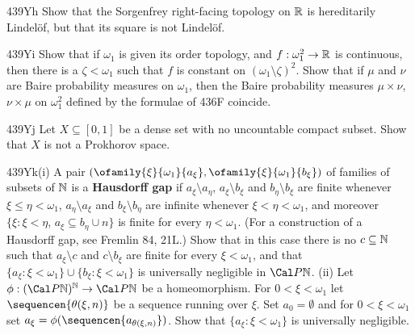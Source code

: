 {\spheader 439Yh Show that the Sorgenfrey right-facing topology on
$\Bbb R$ is hereditarily Lindel\"of, but that its square is not
Lindel\"of.

\spheader 439Yi Show that if $\omega_1$ is given its order topology, and
$f:\omega_1^2\to\Bbb R$ is continuous, then there is a $\zeta<\omega_1$
such that $f$ is constant on $(\omega_1\setminus\zeta)^2$.
   Show that if $\mu$ and $\nu$ are Baire probability
measures on $\omega_1$, then the Baire probability measures
$\mu\times\nu$, $\nu\times\mu$ on $\omega_1^2$ defined by the formulae
of 436F coincide.

\spheader 439Yj Let $X\subseteq[0,1]$ be a dense set with no
uncountable compact subset.   Show that $X$ is not a Prokhorov space.

\spheader 439Yk(i) A pair
$(\ofamily{\xi}{\omega_1}{a_{\xi}},\ofamily{\xi}{\omega_1}{b_{\xi}})$ of
families of subsets
of $\Bbb N$ is a {\bf Hausdorff gap} if $a_{\xi}\setminus a_{\eta}$,
$a_{\xi}\setminus b_{\xi}$ and $b_{\eta}\setminus b_{\xi}$ are finite whenever
$\xi\le\eta<\omega_1$, $a_{\eta}\setminus a_{\xi}$ and
$b_{\xi}\setminus b_{\eta}$ are infinite whenever
$\xi<\eta<\omega_1$, and moreover
$\{\xi:\xi<\eta$, $a_{\xi}\subseteq b_{\eta}\cup n\}$ is finite for every
$\eta<\omega_1$.   (For a construction of a Hausdorff gap, see
{\smc Fremlin 84}, 21L.)   Show that in this case there is no $c\subseteq\Bbb N$
such that $a_{\xi}\setminus c$ and $c\setminus b_{\xi}$ are finite for every
$\xi<\omega_1$, and that
$\{a_{\xi}:\xi<\omega_1\}\cup\{b_{\xi}:\xi<\omega_1\}$ is universally
negligible in $\Cal P\Bbb N$.   (ii) Let
$\phi:(\Cal P\Bbb N)^{\Bbb N}\to\Cal P\Bbb N$ be a homeomorphism.
For $0<\xi<\omega_1$ let
$\sequencen{\theta(\xi,n)}$ be a sequence running over $\xi$.   Set
$a_0=\emptyset$ and for $0<\xi<\omega_1$ set
$a_{\xi}=\phi(\sequencen{a_{\theta(\xi,n)}})$.   Show that
$\{a_{\xi}:\xi<\omega_1\}$ is universally negligible.
}%

